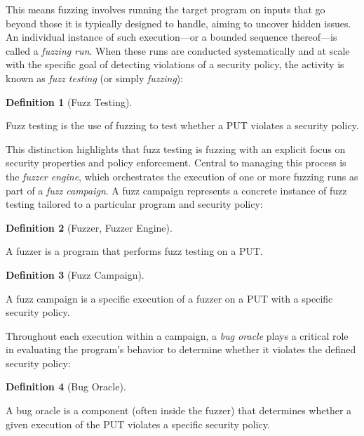 \documentclass[
  a4paper,
  DIV=11,
  numbers=noendperiod]{scrreprt}
\theoremstyle{definition}
\newtheorem{definition}{Definition}[chapter]
\theoremstyle{remark}
\begin{document}
This means fuzzing involves running the target program on inputs that go
beyond those it is typically designed to handle, aiming to uncover
hidden issues. An individual instance of such execution---or a bounded
sequence thereof---is called a \emph{fuzzing run}. When these runs are
conducted systematically and at scale with the specific goal of
detecting violations of a security policy, the activity is known as
\emph{fuzz testing} (or simply \emph{fuzzing}):

\begin{definition}[Fuzz
Testing]\protect\hypertarget{def-fuzz-testing}{}\label{def-fuzz-testing}

Fuzz testing is the use of fuzzing to test whether a PUT violates a
security policy.

\end{definition}

This distinction highlights that fuzz testing is fuzzing with an
explicit focus on security properties and policy enforcement. Central to
managing this process is the \emph{fuzzer engine}, which orchestrates
the execution of one or more fuzzing runs as part of a \emph{fuzz
campaign}. A fuzz campaign represents a concrete instance of fuzz
testing tailored to a particular program and security policy:

\begin{definition}[Fuzzer, Fuzzer
Engine]\protect\hypertarget{def-fuzzer}{}\label{def-fuzzer}

A fuzzer is a program that performs fuzz testing on a PUT.

\end{definition}

\begin{definition}[Fuzz
Campaign]\protect\hypertarget{def-campaign}{}\label{def-campaign}

A fuzz campaign is a specific execution of a fuzzer on a PUT with a
specific security policy.

\end{definition}

Throughout each execution within a campaign, a \emph{bug oracle} plays a
critical role in evaluating the program's behavior to determine whether
it violates the defined security policy:

\begin{definition}[Bug
Oracle]\protect\hypertarget{def-oracle}{}\label{def-oracle}

A bug oracle is a component (often inside the fuzzer) that determines
whether a given execution of the PUT violates a specific security
policy.

\end{definition}
\end{document}
